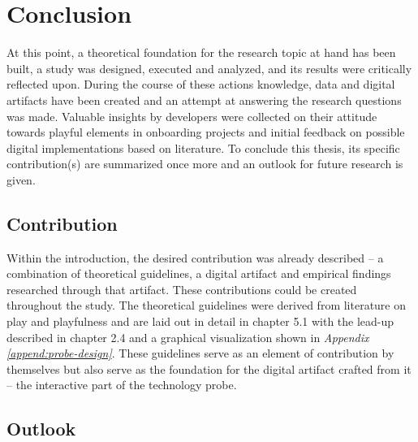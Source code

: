 \section{Conclusion}

At this point, a theoretical foundation for the research topic at hand has been built, a study was designed, executed and analyzed, and its results were critically reflected upon. During the course of these actions knowledge, data and digital artifacts have been created and an attempt at answering the research questions was made. Valuable insights by developers were collected on their attitude towards playful elements in onboarding projects and initial feedback on possible digital implementations based on literature. To conclude this thesis, its specific contribution(s) are summarized once more and an outlook for future research is given.

\subsection{Contribution}

Within the introduction, the desired contribution was already described -- a combination of theoretical guidelines, a digital artifact and empirical findings researched through that artifact. These contributions could be created throughout the study. The theoretical guidelines were derived from literature on play and playfulness and are laid out in detail in chapter 5.1 with the lead-up described in chapter 2.4 and a graphical visualization shown in \textit{Appendix \ref{append:probe-design}}. These guidelines serve as an element of contribution by themselves but also serve as the foundation for the digital artifact crafted from it -- the interactive part of the technology probe.

\subsection{Outlook}






